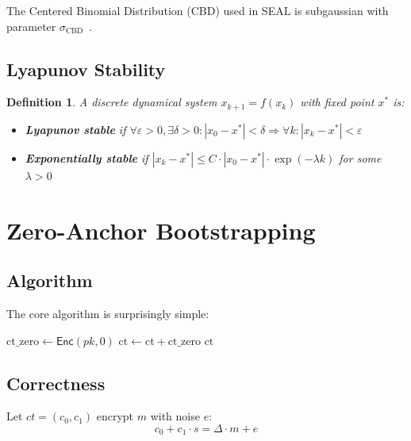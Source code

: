 \documentclass[11pt,a4paper]{article}
\newtheorem{definition}[theorem]{Definition}
\begin{document}
The Centered Binomial Distribution (CBD) used in SEAL is subgaussian with parameter $\sigma_{\text{CBD}}$~\cite{vershynin2018}.

\subsection{Lyapunov Stability}

\begin{definition}
A discrete dynamical system $x_{k+1} = f(x_k)$ with fixed point $x^*$ is:
\begin{itemize}
    \item \textbf{Lyapunov stable} if $\forall\varepsilon > 0, \exists\delta > 0: |x_0 - x^*| < \delta \Rightarrow \forall k: |x_k - x^*| < \varepsilon$
    \item \textbf{Exponentially stable} if $|x_k - x^*| \leq C \cdot |x_0 - x^*| \cdot \exp(-\lambda k)$ for some $\lambda > 0$
\end{itemize}
\end{definition}

\section{Zero-Anchor Bootstrapping}

\subsection{Algorithm}

The core algorithm is surprisingly simple:

\begin{algorithm}[H]
\caption{TrueBootstrapper: ct + Enc(0)}
\begin{algorithmic}[1]
\State $\text{ct\_zero} \gets \mathsf{Enc}(pk, 0)$ 
    \State $\text{ct} \gets \text{ct} + \text{ct\_zero}$ 
\EndFor
\State \Return $\text{ct}$ 
\end{algorithmic}
\end{algorithm}

\subsection{Correctness}

Let $ct = (c_0, c_1)$ encrypt $m$ with noise $e$:
\[
c_0 + c_1 \cdot s = \Delta \cdot m + e
\]
\end{document}
